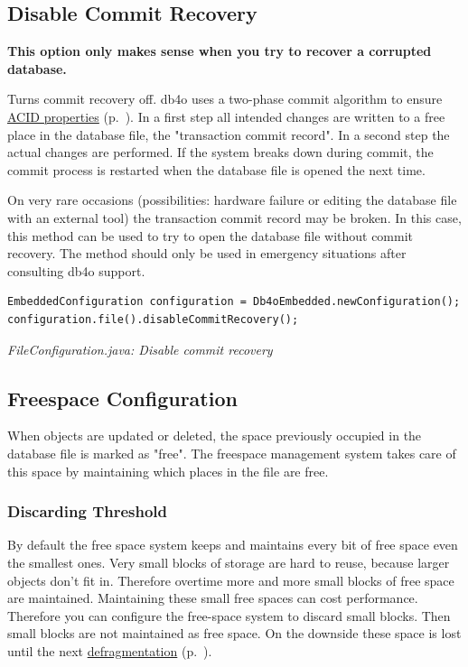 \subsection{Disable Commit Recovery}
\label{ref:configuration-file-disable-commit-recovery}

\textbf{This option only makes sense when you try to recover a corrupted database.}

Turns commit recovery off. db4o uses a two-phase commit algorithm to ensure \hyperref[ref:basics-acid-and-transactions]{ACID properties} (p.~\pageref{ref:basics-acid-and-transactions}). In a first step all intended changes are written to a free place in the database file, the "transaction commit record". In a second step the actual changes are performed. If the system breaks down during commit, the commit process is restarted when the database file is opened the next time.

On very rare occasions (possibilities: hardware failure or editing the database file with an external tool) the transaction commit record may be broken. In this case, this method can be used to try to open the database file without commit recovery. The method should only be used in emergency situations after consulting db4o support.

\begin{lstlisting}
EmbeddedConfiguration configuration = Db4oEmbedded.newConfiguration();
configuration.file().disableCommitRecovery();
\end{lstlisting}

{\small\itshape FileConfiguration.java: Disable commit recovery\par}
\medskip

\subsection{Freespace Configuration}
\label{ref:configuration-file-freespace-configuration}

When objects are updated or deleted, the space previously occupied in the database file is marked as "free". The freespace management system takes care of this space by maintaining which places in the file are free.

\subsubsection{Discarding Threshold}
\label{ref:configuration-file-freespace-configuration:discard}

By default the free space system keeps and maintains every bit of free space even the smallest ones. Very small blocks of storage are hard to reuse, because larger objects don't fit in. Therefore overtime more and more small blocks of free space are maintained. Maintaining these small free spaces can cost performance. Therefore you can configure the free-space system to discard small blocks. Then small blocks are not maintained as free space. On the downside these space is lost until the next \hyperref[ref:advanced-topics-defragment]{defragmentation} (p.~\pageref{ref:advanced-topics-defragment}).

